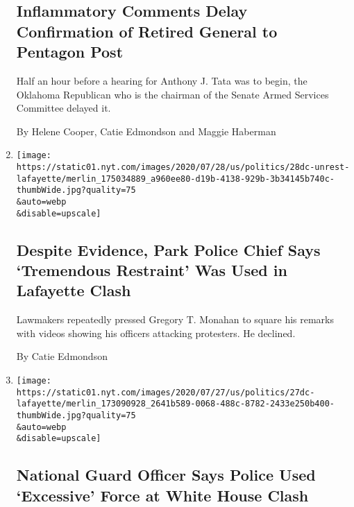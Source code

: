 \begin{enumerate}
{  \subsection{Inflammatory Comments Delay Confirmation of Retired
  General to Pentagon
  Post}\label{inflammatory-comments-delay-confirmation-of-retired-general-to-pentagon-post}}

  Half an hour before a hearing for Anthony J. Tata was to begin, the
  Oklahoma Republican who is the chairman of the Senate Armed Services
  Committee delayed it.

  By Helene Cooper, Catie Edmondson and Maggie Haberman
\item
  \href{/2020/07/28/us/politics/lafayette-square-park-police-protests.html}{}

  \texttt{[image: https://static01.nyt.com/images/2020/07/28/us/politics/28dc-unrest-lafayette/merlin\_175034889\_a960ee80-d19b-4138-929b-3b34145b740c-thumbWide.jpg?quality=75\\\&auto=webp\\\&disable=upscale]}

  \hypertarget{despite-evidence-park-police-chief-says-tremendous-restraint-was-used-in-lafayette-clash}{%
  \subsection{Despite Evidence, Park Police Chief Says `Tremendous
  Restraint' Was Used in Lafayette
  Clash}\label{despite-evidence-park-police-chief-says-tremendous-restraint-was-used-in-lafayette-clash}}

  Lawmakers repeatedly pressed Gregory T. Monahan to square his remarks
  with videos showing his officers attacking protesters. He declined.

  By Catie Edmondson
\item
  \href{/2020/07/27/us/politics/national-guard-excessive-force-lafayette-square.html}{}

  \texttt{[image: https://static01.nyt.com/images/2020/07/27/us/politics/27dc-lafayette/merlin\_173090928\_2641b589-0068-488c-8782-2433e250b400-thumbWide.jpg?quality=75\\\&auto=webp\\\&disable=upscale]}

  \hypertarget{national-guard-officer-says-police-used-excessive-force-at-white-house-clash}{%
  \subsection{National Guard Officer Says Police Used `Excessive' Force
  at White House
  Clash}\label{national-guard-officer-says-police-used-excessive-force-at-white-house-clash}}


\end{enumerate}
